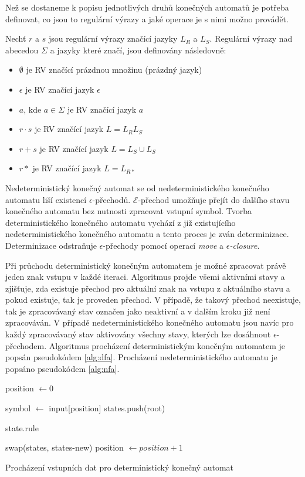Než se dostaneme k popisu jednotlivých druhů konečných automatů je potřeba definovat, co jsou to regulární
výrazy a jaké operace je s nimi možno provádět.

Nechť $r$ a $s$ jsou regulární výrazy značící jazyky $L_R$ a $L_S$.
Regulární výrazy nad abecedou $\Sigma$ a jazyky které značí, jsou definovány následovně:

\begin{itemize}
    \item{$\emptyset$ je RV značící prázdnou množinu (prázdný jazyk)}
    \item{$\epsilon$ je RV značící jazyk ${\epsilon}$}
    \item{$a$, kde $a \in \Sigma$ je RV značící jazyk ${a}$}
    \item{$r\cdot s$ je RV značící jazyk $L = L_R L_S$}
    \item{$r+s$ je RV značící jazyk $L = L_S \cup L_S$}
    \item{$r*$ je RV značící jazyk $L = L_{R*}$}
\end{itemize}

Nedeterministický konečný automat se od nedeterministického konečného automatu
liší existencí $\epsilon$-přechodů. $\mathcal{E}$-přechod umožňuje přejít do dalšího stavu konečného
automatu bez nutnosti zpracovat vstupní symbol.
Tvorba deterministického konečného automatu vychází z již existujícího nedeterministického
konečného automatu a tento proces je zván determinizace. Determinizace odstraňuje $\epsilon$-přechody
pomocí operací \textit{move} a \textit{$\epsilon$-closure}.

Při průchodu deterministický konečným automatem je možné zpracovat právě jeden znak vstupu v
každé iteraci. Algoritmus projde všemi aktivními stavy a zjišťuje,
zda existuje přechod pro aktuální znak na vstupu z aktuálního stavu
a pokud existuje, tak je proveden přechod. V případě, že takový přechod neexistuje, tak je zpracovávaný stav
označen jako neaktivní a v dalším kroku již není zpracováván. V případě nedeterministického
konečného automatu jsou navíc pro každý zpracovávaný stav aktivovány všechny stavy, kterých lze dosáhnout
$\epsilon$-přechodem. Algoritmus procházení deterministickým konečným automatem je popsán pseudokódem \ref{alg:dfa}.
Procházení nedeterministického automatu je popsáno pseudokódem \ref{alg:nfa}.

\begin{algorithm}
    position $\leftarrow 0$\;
    {
        symbol $\leftarrow$ input[position]\;
        states.push(root)\;

        {
             {\Return state.rule}
        }

        swap(states, states-new)\;
        position $\leftarrow position + 1$\;
    }
    \caption{Procházení vstupních dat pro deterministický konečný automat}
    \label{alg:dfa}
\end{algorithm}


